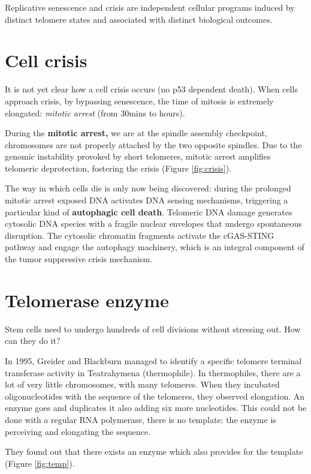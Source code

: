 Replicative senescence and crisis are independent cellular programs
induced by distinct telomere states and associated with distinct
biological outcomes.

\hypertarget{cell-crisis}{%
\section{Cell crisis}\label{cell-crisis}}

It is not yet clear how a cell crisis occurs (no p53 dependent death).
When cells approach crisis, by bypassing senescence, the time of mitosis
is extremely elongated: \emph{mitotic arrest} (from 30mins to hours).

During the \textbf{mitotic arrest,} we are at the spindle assembly
checkpoint, chromosomes are not properly attached by the two opposite
spindles. Due to the genomic instability provoked by short telomeres,
mitotic arrest amplifies telomeric deprotection, fostering the crisis (Figure \ref{fig:crisis}).

The way in which cells die is only now being discovered: during the prolonged
mitotic arrest exposed DNA activates DNA sensing mechanisms, triggering
a particular kind of \textbf{autophagic cell death}. Telomeric DNA
damage generates cytosolic DNA species with a fragile nuclear envelopes
that undergo spontaneous disruption. The cytosolic chromatin fragments
activate the cGAS-STING pathway and engage the autophagy machinery,
which is an integral component of the tumor suppressive crisis
mechanism.

\hypertarget{telomerase-enzyme}{%
\section{Telomerase enzyme}\label{telomerase-enzyme}}

Stem cells need to undergo hundreds of cell divisions without stressing
out. How can they do it?

In 1995, Greider and Blackburn managed to identify a specific telomere
terminal transferase activity in Teatrahymena (thermophile). In
thermophiles, there are a lot of very little chromosomes, with many
telomeres. When they incubated oligonucleotides with the sequence of the
telomeres, they observed elongation. An enzyme goes and duplicates it
also adding six more nucleotides. This could not be done with a regular
RNA polymerase, there is no template: the enzyme is perceiving and
elongating the sequence.

They found out that there exists an enzyme which also provides for the
template (Figure \ref{fig:temp}).

